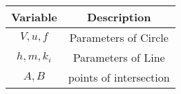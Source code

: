 \begin{tabular}{|c|c|}
        \hline
        Variable & Description\\
        \hline
        $V,u,f$ & Parameters of Circle\\
        \hline
        $h,m,k_i$ & Parameters of Line\\
        \hline
        $A,B$ & points of intersection\\
        \hline
\end{tabular}